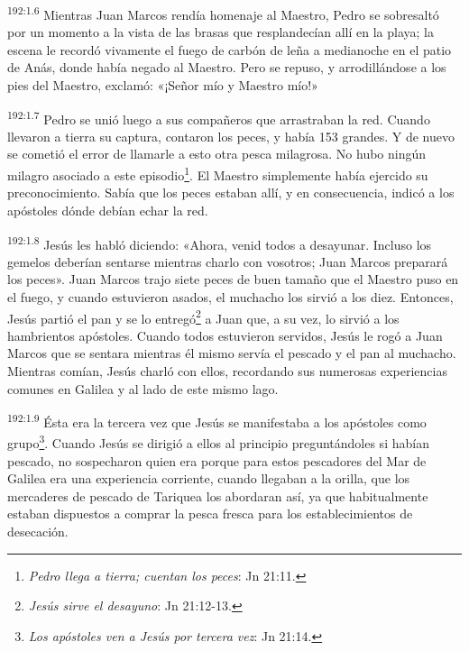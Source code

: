 \par 
\textsuperscript{192:1.6} Mientras Juan Marcos rendía homenaje al Maestro, Pedro se sobresaltó por un momento a la vista de las brasas que resplandecían allí en la playa; la escena le recordó vivamente el fuego de carbón de leña a medianoche en el patio de Anás, donde había negado al Maestro. Pero se repuso, y arrodillándose a los pies del Maestro, exclamó: «¡Señor mío y Maestro mío!»

\par 
\textsuperscript{192:1.7} Pedro se unió luego a sus compañeros que arrastraban la red. Cuando llevaron a tierra su captura, contaron los peces, y había 153 grandes. Y de nuevo se cometió el error de llamarle a esto otra pesca milagrosa. No hubo ningún milagro asociado a este episodio\footnote{\textit{Pedro llega a tierra; cuentan los peces}: Jn 21:11.}. El Maestro simplemente había ejercido su preconocimiento. Sabía que los peces estaban allí, y en consecuencia, indicó a los apóstoles dónde debían echar la red.

\par 
\textsuperscript{192:1.8} Jesús les habló diciendo: «Ahora, venid todos a desayunar. Incluso los gemelos deberían sentarse mientras charlo con vosotros; Juan Marcos preparará los peces». Juan Marcos trajo siete peces de buen tamaño que el Maestro puso en el fuego, y cuando estuvieron asados, el muchacho los sirvió a los diez. Entonces, Jesús partió el pan y se lo entregó\footnote{\textit{Jesús sirve el desayuno}: Jn 21:12-13.} a Juan que, a su vez, lo sirvió a los hambrientos apóstoles. Cuando todos estuvieron servidos, Jesús le rogó a Juan Marcos que se sentara mientras él mismo servía el pescado y el pan al muchacho. Mientras comían, Jesús charló con ellos, recordando sus numerosas experiencias comunes en Galilea y al lado de este mismo lago.

\par 
\textsuperscript{192:1.9} Ésta era la tercera vez que Jesús se manifestaba a los apóstoles como grupo\footnote{\textit{Los apóstoles ven a Jesús por tercera vez}: Jn 21:14.}. Cuando Jesús se dirigió a ellos al principio preguntándoles si habían pescado, no sospecharon quien era porque para estos pescadores del Mar de Galilea era una experiencia corriente, cuando llegaban a la orilla, que los mercaderes de pescado de Tariquea los abordaran así, ya que habitualmente estaban dispuestos a comprar la pesca fresca para los establecimientos de desecación.

